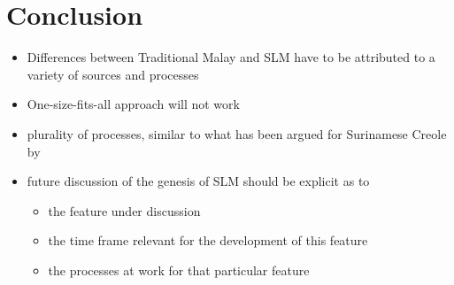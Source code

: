 \documentclass[a4paper,12pt]{article}
\begin{document}
\section{Conclusion}
\begin{itemize}
 \item Differences between Traditional Malay and SLM have to be attributed to a variety of sources and processes
 \item One-size-fits-all approach will not work
 \item plurality of processes, similar to what has  been argued for Surinamese Creole by \citet{Migge2008}
 \item future discussion of the genesis of SLM should be explicit as to
   \begin{itemize}
    \item the feature  under discussion
    \item the time frame relevant for the development of this feature
    \item the processes at work for that particular feature
   \end{itemize}

\end{itemize}
\end{document}
